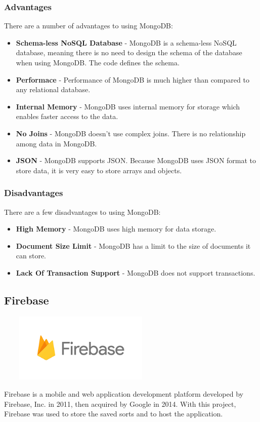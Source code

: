 \subsubsection{Advantages}
There are a number of advantages to using MongoDB:

\begin{itemize}
    \item \textbf{Schema-less NoSQL Database} - MongoDB is a schema-less NoSQL
    database, meaning there is no need to design the schema of the database when
    using MongoDB. The code defines the schema.
    \item \textbf{Performace} - Performance of MongoDB is much higher than
    compared to any relational database.
    \item \textbf{Internal Memory} - MongoDB uses internal memory for storage
    which enables faster access to the data.
    \item \textbf{No Joins} - MongoDB doesn't use complex joins. There is no
    relationship among data in MongoDB.
    \item \textbf{JSON} - MongoDB supports JSON. Because MongoDB uses JSON
    format to store data, it is very easy to store arrays and objects.
\end{itemize}

\subsubsection{Disadvantages}
There are a few disadvantages to using MongoDB:

\begin{itemize}
    \item \textbf{High Memory} - MongoDB uses high memory for data storage.
    \item \textbf{Document Size Limit} - MongoDB has a limit to the size of
    documents it can store.
    \item \textbf{Lack Of Transaction Support} - MongoDB does not support
    transactions.
\end{itemize}
\par
\medskip
\par
\medskip

\newpage
\subsection{Firebase}
\par
\medskip
\begin{center}
    \includegraphics[width=8cm,height=3.3cm,keepaspectratio]{images/firebase}
\end{center}
Firebase is a mobile and web application development platform developed by Firebase, Inc. in 2011, then acquired by Google in 2014. With this project, Firebase was used to store the saved sorts and to host the application.

